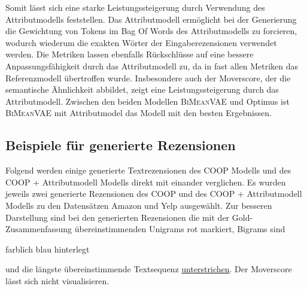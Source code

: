 Somit lässt sich eine starke Leistungssteigerung durch Verwendung des Attributmodells feststellen. 
Das Attributmodell ermöglicht bei der Generierung die Gewichtung von Tokens im Bag Of Words des Attributmodells zu forcieren, wodurch wiederum die exakten Wörter der Eingaberezensionen verwendet werden.
Die Metriken lassen ebenfalls Rückschlüsse auf eine bessere Anpassungsfähigkeit durch das Attributmodell zu, da in fast allen Metriken das Referenzmodell übertroffen wurde.
Insbesondere auch der Moverscore, der die semantische Ähnlichkeit abbildet, zeigt eine Leistungssteigerung durch das Attributmodell.
Zwischen den beiden Modellen \textsc{BiMeanVAE} und Optimus ist \textsc{BiMeanVAE} mit Attributmodel das Modell mit den besten Ergebnissen.

\subsection{Beispiele für generierte Rezensionen}
\label{example}


\small
\newlength{\DepthReference}
\setlength{\DepthReference}{1pt}%

\newlength{\HeightReference}
\setlength{\HeightReference}{7pt}


\newlength{\Width}%

\newcommand{\ccolorbox}[2][red]%
{%
    \settowidth{\Width}{#2}%
    \setlength{\fboxsep}{1pt}%
    \colorbox{#1}%
    {%
        \raisebox{-\DepthReference}%
        {%
                \parbox[b][\HeightReference+\DepthReference][c]{\Width}{\centering#2}%
        }%
    }%
}



\normalsize


Folgend werden einige generierte Textrezensionen des COOP Modells und des COOP + Attributmodell Modells direkt mit einander verglichen.
Es wurden jeweils zwei generierte Rezensionen des COOP und des COOP + Attributmodell Modells zu den Datensätzen Amazon und Yelp ausgewählt. 
Zur besseren Darstellung sind bei den generierten Rezensionen die mit der Gold-Zusammenfassung übereinstimmenden Unigrams \textcolor{HighlightColor}{rot} markiert, Bigrams sind \ccolorbox[BackgroundColor]{farblich blau hinterlegt} und die längste übereinstimmende Textsequenz \underline{unterstrichen}.
Der Moverscore lässt sich nicht visualisieren.

